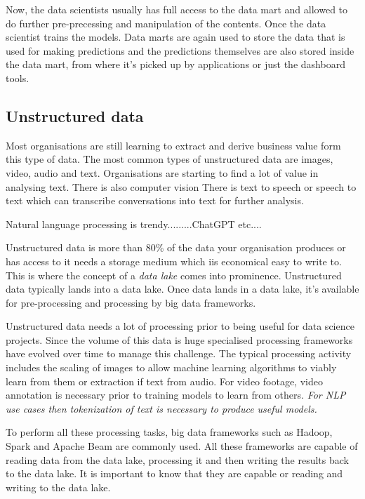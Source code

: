 Now, the data scientists usually has full access to the data mart and allowed to do further pre-precessing and manipulation of the contents.
Once the data scientist trains the models.
Data marts are again used to store the data that is used for making predictions and the predictions themselves are also stored inside the data mart, from where it's picked up by applications or just the dashboard tools.

\subsection{Unstructured data}
Most organisations are still learning to extract and derive business value form this type of data.
The most common types of unstructured data are images, video, audio and text.
Organisations are starting to find a lot of value in analysing text.
There is also computer vision
There is text to speech or speech to text which can transcribe conversations into text for further analysis.

\begin{note}
    Natural language processing is trendy.........ChatGPT etc....
\end{note}

Unstructured data is more than 80\% of the data your organisation produces or has access to it needs a storage medium which iis economical easy to write to.
This is where the concept of a \textit{data lake} comes into prominence.
Unstructured data typically lands into a data lake.
Once data lands in a data lake, it's available for pre-processing and processing by big data frameworks.

Unstructured data needs a lot of processing prior to being useful for data science projects.
Since the volume of this data is huge specialised processing frameworks have evolved over time to manage this challenge.
The typical processing activity includes the scaling of images to allow machine learning algorithms to viably learn from them or extraction if text from audio.
For video footage, video annotation is necessary prior to training models to learn from others.
\textit{For NLP use cases then tokenization of text is necessary to produce useful models.}

To perform all these processing tasks, big data frameworks such as Hadoop, Spark and Apache Beam are commonly used.
All these frameworks are capable of reading data from the data lake, processing it and then writing the results back to the data lake.
It is important to know that they are capable or reading and writing to the data lake.

